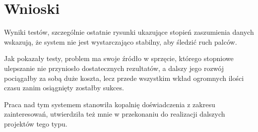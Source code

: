 \chapter{Wnioski}\label{ch:summary}

Wyniki testów, szczególnie ostatnie rysunki ukazujące stopień zaszumienia danych wskazują, że system nie jest wystarczająco stabilny, aby śledzić ruch palców.

Jak pokazały testy, problem ma swoje źródło w sprzęcie, którego stopniowe ulepszanie nie przyniosło dostatecznych rezultatów, a dalszy jego rozwój pociągałby za sobą duże koszta, lecz przede wszystkim wkład ogromnych ilości czasu zanim osiągnięty zostałby sukces.

Praca nad tym systemem stanowiła kopalnię doświadczenia z zakresu zainteresowań, utwierdziła też mnie w przekonaniu do realizacji dalszych projektów tego typu.